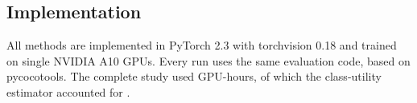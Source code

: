 \subsection{Implementation}
\label{sec:setup_impl}

All methods are implemented in PyTorch 2.3 with torchvision 0.18 and trained on single NVIDIA A10 GPUs. Every run uses the same evaluation code, based on pycocotools. The complete study used  GPU-hours, of which the class-utility estimator accounted for .

